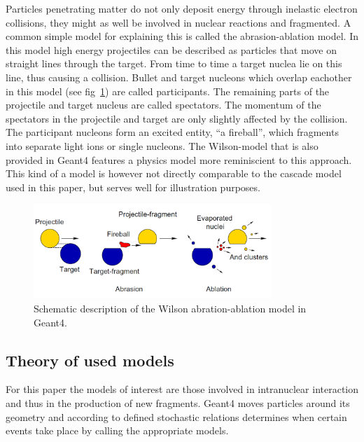 Particles penetrating matter do not only deposit energy through inelastic electron collisions, they might as well be involved in nuclear reactions and fragmented. A common simple model for explaining this is called the abrasion-ablation model. In this model high energy projectiles can be described as particles that move on straight lines through the
target. From time to time a target nuclea lie on this line, thus causing a collision. Bullet
and target nucleons which overlap eachother in this model (see fig~\ref{fig:ablationabration}) are called participants. The remaining parts of the projectile and target nucleus are called spectators. The momentum of the spectators in the projectile and target are only slightly affected by the collision. The participant nucleons form an excited entity, ``a fireball'', which fragments into separate light ions or single nucleons.
The Wilson-model\cite[Chapter 27]{physicsManual} that is also provided in Geant4 features a physics model more reminiscient to this approach. This kind of a model is however not directly comparable to the cascade model used in this paper, but serves well for illustration purposes.
\begin{figure}[h]
\begin{center}
\includegraphics[width=0.8\textwidth]{images/ablationabration.png}  
\caption{Schematic description of the Wilson abration-ablation model in Geant4.}
 \label{fig:ablationabration}
 \end{center}
 \end{figure}



\subsection{Theory of used models} %

For this paper the models of interest are those involved in intranuclear interaction and thus in the production of new fragments. Geant4 moves particles around its geometry and according to defined stochastic relations determines when certain events take place by calling the appropriate models.

